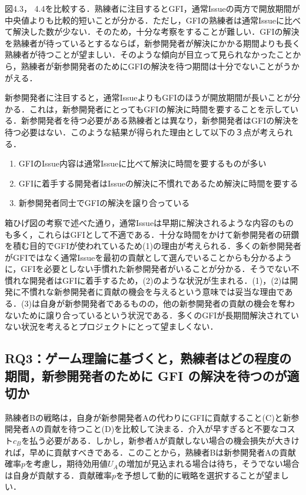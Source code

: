 \documentclass[11pt]{jreport}
\begin{document}
図4.3， 4.4を比較する．熟練者に注目するとGFI，通常Issueの両方で開放期間が中央値よりも比較的短いことが分かる．ただし，GFIの熟練者は通常Issueに比べて解決した数が少ない．そのため，十分な考察をすることが難しい．GFIの解決を熟練者が待っているとするならば，新参開発者が解決にかかる期間よりも長く熟練者が待つことが望ましい．そのような傾向が目立って見られなかったことから，熟練者が新参開発者のためにGFIの解決を待つ期間は十分でないことがうかがえる．

新参開発者に注目すると，通常IssueよりもGFIのほうが開放期間が長いことが分かる．これは，新参開発者にとってもGFIの解決に時間を要することを示している．新参開発者を待つ必要がある熟練者とは異なり，新参開発者はGFIの解決を待つ必要はない．このような結果が得られた理由として以下の３点が考えられる．

\begin{enumerate}
  \item GFIのIssue内容は通常Issueに比べて解決に時間を要するものが多い
  \item GFIに着手する開発者はIssueの解決に不慣れであるため解決に時間を要する
  \item 新参開発者同士でGFIの解決を譲り合っている
\end{enumerate}

箱ひげ図の考察で述べた通り，通常Issueは早期に解決されるような内容のものも多く，これらはGFIとして不適である．十分な時間をかけて新参開発者の研鑽を積む目的でGFIが使われているため(1)の理由が考えられる．多くの新参開発者がGFIではなく通常Issueを最初の貢献として選んでいることからも分かるように，GFIを必要としない手慣れた新参開発者がいることが分かる．そうでない不慣れな開発者はGFIに着手するため，(2)のような状況が生まれる．(1)，(2)は開発に不慣れな新参開発者に貢献の機会を与えるという意味では妥当な理由である．(3)は自身が新参開発者であるものの，他の新参開発者の貢献の機会を奪わないために譲り合っているという状況である．多くのGFIが長期間解決されていない状況を考えるとプロジェクトにとって望ましくない．

\subsection{RQ3：ゲーム理論に基づくと，熟練者はどの程度の期間，新参開発者のために GFI の解決を待つのが適切か}
熟練者Bの戦略は，自身が新参開発者Aの代わりにGFIに貢献すること(C)と新参開発者Aの貢献を待つこと(D)を比較して決まる．介入が早すぎると不要なコスト$c_B$を払う必要がある．しかし，新参者Aが貢献しない場合の機会損失が大きければ，早めに貢献すべきである．このことから，熟練者Bは新参開発者Aの貢献確率$p$を考慮し，期待効用値$U_A$の増加が見込まれる場合は待ち，そうでない場合は自身が貢献する．貢献確率$p$を予想して動的に戦略を選択することが望ましい．
\end{document}
